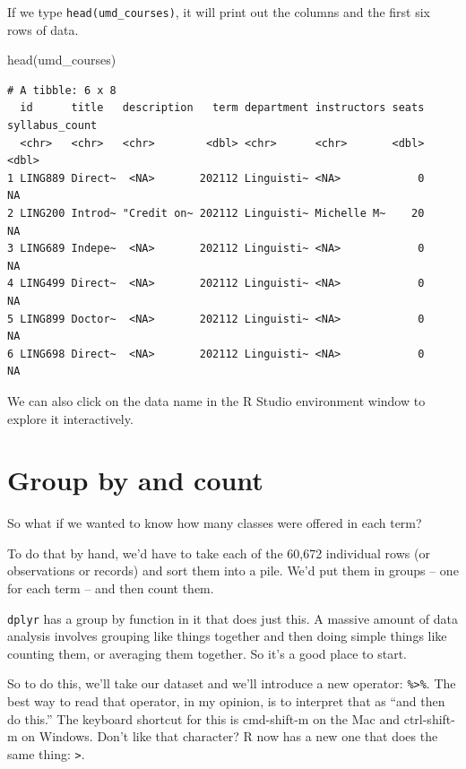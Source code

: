 \documentclass[
  letterpaper,
  DIV=11,
  numbers=noendperiod]{scrreprt}
\newenvironment{Shaded}{\begin{snugshade}}{\end{snugshade}}
\newcommand{\FunctionTok}[1]{\textcolor[rgb]{0.28,0.35,0.67}{#1}}
\newcommand{\NormalTok}[1]{\textcolor[rgb]{0.00,0.23,0.31}{#1}}
\begin{document}
If we type \texttt{head(umd\_courses)}, it will print out the columns
and the first six rows of data.

\begin{Shaded}
\begin{Highlighting}[]
\FunctionTok{head}\NormalTok{(umd\_courses)}
\end{Highlighting}
\end{Shaded}

\begin{verbatim}
# A tibble: 6 x 8
  id      title   description   term department instructors seats syllabus_count
  <chr>   <chr>   <chr>        <dbl> <chr>      <chr>       <dbl>          <dbl>
1 LING889 Direct~  <NA>       202112 Linguisti~ <NA>            0             NA
2 LING200 Introd~ "Credit on~ 202112 Linguisti~ Michelle M~    20             NA
3 LING689 Indepe~  <NA>       202112 Linguisti~ <NA>            0             NA
4 LING499 Direct~  <NA>       202112 Linguisti~ <NA>            0             NA
5 LING899 Doctor~  <NA>       202112 Linguisti~ <NA>            0             NA
6 LING698 Direct~  <NA>       202112 Linguisti~ <NA>            0             NA
\end{verbatim}

We can also click on the data name in the R Studio environment window to
explore it interactively.

\hypertarget{group-by-and-count}{%
\section{Group by and count}\label{group-by-and-count}}

So what if we wanted to know how many classes were offered in each term?

To do that by hand, we'd have to take each of the 60,672 individual rows
(or observations or records) and sort them into a pile. We'd put them in
groups -- one for each term -- and then count them.

\texttt{dplyr} has a group by function in it that does just this. A
massive amount of data analysis involves grouping like things together
and then doing simple things like counting them, or averaging them
together. So it's a good place to start.

So to do this, we'll take our dataset and we'll introduce a new
operator: \texttt{\%\textgreater{}\%}. The best way to read that
operator, in my opinion, is to interpret that as ``and then do this.''
The keyboard shortcut for this is cmd-shift-m on the Mac and
ctrl-shift-m on Windows. Don't like that character? R now has a new one
that does the same thing: \texttt{\textbar{}\textgreater{}}.
\end{document}
